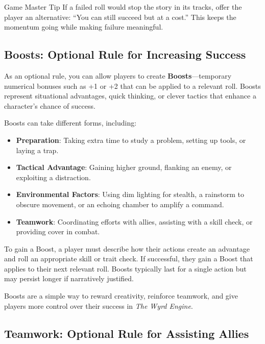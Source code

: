 \begin{DndComment}{Game Master Tip}
    If a failed roll would stop the story in its tracks, offer the player an alternative: “You can still succeed but at a cost.” This keeps the momentum going while making failure meaningful.
\end{DndComment}

\subsection{Boosts: Optional Rule for Increasing Success}

As an optional rule, you can allow players to create \textbf{Boosts}—temporary numerical bonuses such as +1 or +2 that can be applied to a relevant roll. Boosts represent situational advantages, quick thinking, or clever tactics that enhance a character’s chance of success.  

Boosts can take different forms, including:  

\begin{itemize}
    \item \textbf{Preparation}: Taking extra time to study a problem, setting up tools, or laying a trap.  
    \item \textbf{Tactical Advantage}: Gaining higher ground, flanking an enemy, or exploiting a distraction.  
    \item \textbf{Environmental Factors}: Using dim lighting for stealth, a rainstorm to obscure movement, or an echoing chamber to amplify a command.  
    \item \textbf{Teamwork}: Coordinating efforts with allies, assisting with a skill check, or providing cover in combat.  
\end{itemize}

To gain a Boost, a player must describe how their actions create an advantage and roll an appropriate skill or trait check. If successful, they gain a Boost that applies to their next relevant roll. Boosts typically last for a single action but may persist longer if narratively justified.  

Boosts are a simple way to reward creativity, reinforce teamwork, and give players more control over their success in \textit{The Wyrd Engine}.


\subsection{Teamwork: Optional Rule for Assisting Allies}

